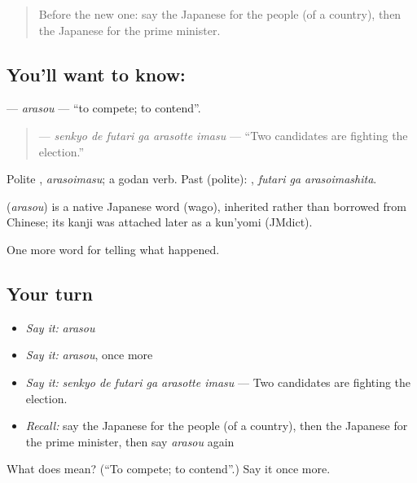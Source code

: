 \begin{quote}
Before the new one: say the Japanese for the people (of a country), then the Japanese for the prime minister.
\end{quote}

\subsection*{You'll want to know: }
\textbf{} — \emph{arasou} — \textquotedblleft{}to compete; to contend\textquotedblright{}.

\begin{quote}
\textbf{  } — \emph{senkyo de futari ga arasotte imasu} — \textquotedblleft{}Two candidates are fighting the election.\textquotedblright{}
\end{quote}

Polite \textbf{}, \emph{arasoimasu}; a godan verb. Past (polite): \textbf{ }, \emph{futari ga arasoimashita}.

\begin{cousinweb}
\textbf{} (\emph{arasou}) is a native Japanese word (wago), inherited rather than borrowed from Chinese; its kanji was attached later as a kun'yomi (JMdict).
\end{cousinweb}

\begin{grammarlens}[title={What you've built}]
One more word for telling what happened.
\end{grammarlens}

\subsection*{Your turn}
\begin{itemize}
\raggedright
  \item \emph{Say it:} \emph{arasou}
  \item \emph{Say it:} \emph{arasou}, once more
  \item \emph{Say it:} \emph{senkyo de futari ga arasotte imasu} — Two candidates are fighting the election.
  \item \emph{Recall:} say the Japanese for the people (of a country), then the Japanese for the prime minister, then say \emph{arasou} again
\end{itemize}

\begin{tcolorbox}[breakable,colback=teal!4,colframe=teal!35!black,title={Before you move on}]
What does  mean? (\textquotedblleft{}To compete; to contend\textquotedblright{}.) Say it once more.
\end{tcolorbox}
